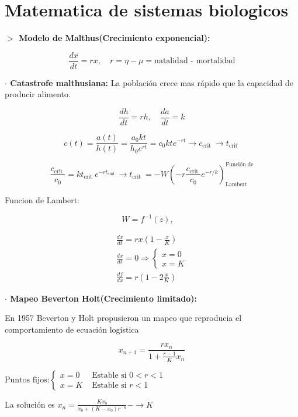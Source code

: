\documentclass[%
 reprint,
 amsmath,amssymb,
 aps,
]{revtex4-1}
\begin{document}
\section{Matematica de sistemas biologicos}

\textbf{$>$ Modelo de Malthus(Crecimiento exponencial):}

$$\frac{d x}{d t}=r x, \quad 
r=\eta-\mu = \text{natalidad - mortalidad}$$


\textbf{$\cdot$ Catastrofe malthusiana:} La población crece mas rápido que la capacidad de producir alimento.

$$\frac{dh}{dt} = rh, \quad \frac{da}{dt} = k$$

$$c(t)=\frac{a(t)}{h(t)}=\frac{a_{0} k t}{h_{0} e^{r t}}=c_{0} k t e^{-r t} \longrightarrow c_{\text {crit }} \rightarrow t_{\text {crit }}$$

$$
\frac{c_{\text {crit }}}{c_{0}}=k t_{\text {crit }} e^{-r t_{\text {cint }}} \rightarrow t_{\text {crit }}=-W\left(-r \frac{c_{\text {crit }}}{c_{0}} e^{-r / k}\right) ^\text {Función de} _\text {Lambert}
$$

Funcion de Lambert:

$$W=f^{-1}(z),\quad $$

$$
\begin{array}{l}
\frac{d x}{d t}=r x\left(1-\frac{x}{K}\right) \\
\frac{d x}{d t}=0 \Rightarrow\left\{\begin{array}{l}
x=0 \\
x=K
\end{array}\right. \\
\frac{d f}{d x}=r\left(1-2 \frac{x}{K}\right)
\end{array}
$$

\textbf{$\cdot$ Mapeo Beverton Holt(Crecimiento limitado):}

En 1957 Beverton y Holt propusieron un mapeo que reproducia el comportamiento de ecuación logística


$$
x_{n+1}=\frac{r x_{n}}{1+\frac{r-1}{K} x_{n}}$$


$
\text{Puntos fijos:}
\left\{
\begin{array}{ll}
  x=0 & \text { Estable si } 0<r<1 \\ 
  x=K & \text { Estable si } r<1
\end{array}
\right.$ 


La solución es $x_{n}=\frac{K x_{0}}{x_{0}+\left(K-x_{0}\right) r^{-n}}-\rightarrow K$
\end{document}

